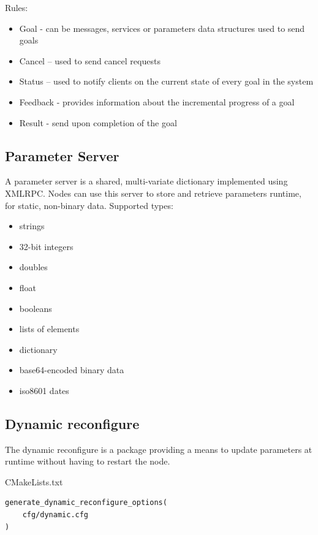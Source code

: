             Rules:
            \begin{itemize}
                \item Goal - can be messages, services or parameters data structures used to send goals
                \item Cancel – used to send cancel requests
                \item Status – used to notify clients on the current state of every goal in the system
                \item Feedback - provides information about the incremental progress of a goal
                \item Result - send upon completion of the goal
            \end{itemize}



        \subsection{Parameter Server}
            A parameter server is a shared, multi-variate dictionary implemented using XMLRPC. Nodes can use this server to store and retrieve parameters runtime, for static, non-binary data.
            Supported types:
            \begin{itemize}
                \item strings
                \item 32-bit integers
                \item doubles
                \item float
                \item booleans
                \item lists of elements
                \item dictionary
                \item base64-encoded binary data
                \item iso8601 dates
            \end{itemize}

        
        
        \subsection{Dynamic reconfigure}
            The dynamic reconfigure is a package providing a means to update parameters at runtime without having to restart the node.

            CMakeLists.txt
\begin{verbatim}
generate_dynamic_reconfigure_options(
    cfg/dynamic.cfg
)
\end{verbatim}


